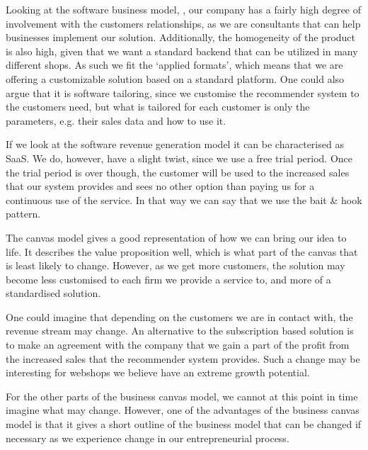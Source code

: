 Looking at the software business model, \citep[pg. 43]{book:jrose}, our company has a fairly high degree of involvement with the customers relationships, as we are consultants that can help businesses implement our solution. 
Additionally, the homogeneity of the product is also high, given that we want a standard backend that can be utilized in many different shops. 
As such we fit the ‘applied formats’, which means that we are offering a customizable solution based on a standard platform. One could also argue that it is software tailoring, since we customise the recommender system to the customers need, but what is tailored for each customer is only the parameters, e.g. their sales data and how to use it.

If we look at the software revenue generation model it can be characterised as SaaS.
We do, however, have a slight twist, since we use a free trial period.
Once the trial period is over though, the customer will be used to the increased sales that our system provides and sees no other option than paying us for a continuous use of the service.
In that way we can say that we use the bait \& hook pattern.


The canvas model gives a good representation of how we can bring our idea to life.
It describes the value proposition well, which is what part of the canvas that is least likely to change. 
However, as we get more customers, the solution may become less customised to each firm we provide a service to, and more of a standardised solution.

One could imagine that depending on the customers we are in contact with, the revenue stream may change. 
An alternative to the subscription based solution is to make an agreement with the company that we gain a part of the profit from the increased sales that the recommender system provides.
Such a change may be interesting for webshops we believe have an extreme growth potential.

For the other parts of the business canvas model, we cannot at this point in time imagine what may change. 
However, one of the advantages of the business canvas model is that it gives a short outline of the business model that can be changed if necessary as we experience change in our entrepreneurial process.


